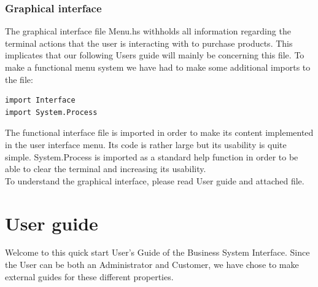 \documentclass[11pt]{article}
\begin{document}
\subsubsection{Graphical interface}
The graphical interface file Menu.hs withholds all information regarding the terminal actions that the user is interacting with to purchase products. This implicates that our following Users guide will mainly be concerning this file. To make a functional menu system we have had to make some additional imports to the file:
\begin{lstlisting}
import Interface
import System.Process
\end{lstlisting}
The functional interface file is imported in order to make its content implemented in the user interface menu. Its code is rather large but its usability is quite simple. System.Process is imported as a standard help function in order to be able to clear the terminal and increasing its usability.
\\
To understand the graphical interface, please read User guide and attached file.
\newpage
\section{User guide}
Welcome to this quick start User's Guide of the Business System Interface. Since the User can be both an Administrator and Customer, we have chose to make external guides for these different properties.
\end{document}
